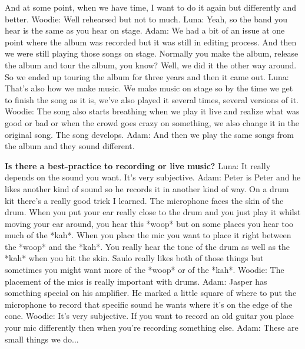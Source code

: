 And at some point, when we have time, I want to do it again but differently and better.
\newline Woodie: Well rehearsed but not to much.
\newline Luna: Yeah, so the band you hear is the same as you hear on stage.
\newline Adam: We had a bit of an issue at one point where the album was recorded but it was still in editing process. And then we were still playing those songs on stage.
Normally you make the album, release the album and tour the album, you know? Well, we did it the other way around. So we ended up touring the album for three years and then it came out.
\newline Luna: That's also how we make music. We make music on stage so by the time we get to finish the song as it is, we've also played it several times, several versions of it.
\newline Woodie: The song also starts breathing when we play it live and realize what was good or bad or when the crowd goes crazy on something, we also change it in the original song.
The song develops.
\newline Adam: And then we play the same songs from the album and they sound different.

\textbf{Is there a best-practice to recording or live music?}
\newline Luna: It really depends on the sound you want. It's very subjective.
\newline Adam: Peter is Peter and he likes another kind of sound so he records it in another kind of way.
On a drum kit there's a really good trick I learned. The microphone faces the skin of the drum. When you put your ear really close to the drum and you just play it whilst moving your ear around,
you hear this *woop* but on some places you hear too much of the *kah*. When you place the mic you want to place it right between the *woop* and the *kah*.
You really hear the tone of the drum as well as the *kah* when you hit the skin. Saulo really likes both of those things but sometimes you might want more of the *woop* or of the *kah*.
\newline Woodie: The placement of the mics is really important with drums.
\newline Adam: Jasper has something special on his amplifier. He marked a little square of where to put the microphone to record that specific sound he wants where it's on the edge of the cone.
\newline Woodie: It's very subjective. If you want to record an old guitar you place your mic differently then when you're recording something else.
\newline Adam: These are small things we do...

